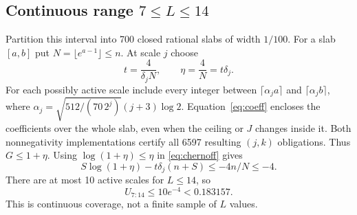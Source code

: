 \documentclass[11pt]{article}
\begin{document}
\subsection{Continuous range $7\le L\le14$}
Partition this interval into 700 closed rational slabs of width $1/100$.
For a slab $[a,b]$ put $N=\lfloor e^{a-1}\rfloor\le n$.
At scale $j$ choose
\[
 t=\frac4{\delta_jN},\qquad\eta=\frac4N=t\delta_j.
\]
For each possibly active scale include every integer between
$\lceil\alpha_ja\rceil$ and $\lceil\alpha_jb\rceil$, where
$\alpha_j=\sqrt{512/(70\,2^j)}(j+3)\log2$.
Equation~\eqref{eq:coeff} encloses the coefficients over the whole slab,
even when the ceiling or $J$ changes inside it.
Both nonnegativity implementations certify all 6597 resulting $(j,k)$
obligations. Thus $G\le1+\eta$. Using $\log(1+\eta)\le\eta$ in
\eqref{eq:chernoff} gives
\[
 S\log(1+\eta)-t\delta_j(n+S)\le-4n/N\le-4.
\]
There are at most 10 active scales for $L\le14$, so
\begin{equation}\label{eq:mid}
 U_{7:14}\le10e^{-4}<0.183157.
\end{equation}
This is continuous coverage, not a finite sample of $L$ values.
\end{document}
